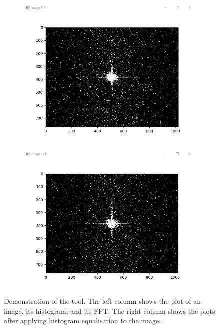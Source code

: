 \documentclass[12pt, twocolumn]{report}
\begin{document}
\begin{figure}[htbp]
\begin{subfigure}{0.45\textwidth}
        \includegraphics[width=1\textwidth]{Figures/Software initial image FFT.jpg}
    \end{subfigure}
    \begin{subfigure}{0.45\textwidth}
        \centering
        \includegraphics[width=1\textwidth]{Figures/Software final image FFT.jpg}
    \end{subfigure}
    \caption{Demonstration of the tool. The left column shows the plot of an image, its histogram, and its FFT. The right column shows the plots after applying histogram equalisation to the image.}
    \label{Software plots}
\end{figure}
\end{document}
